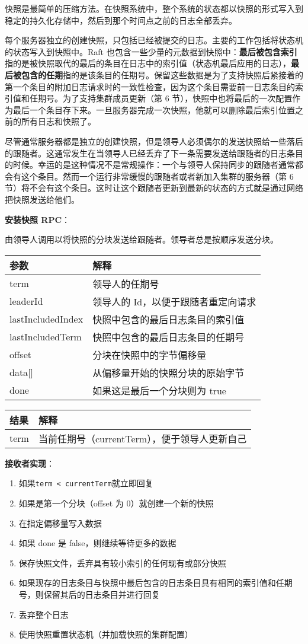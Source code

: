\documentclass[
]{article}
\begin{document}
快照是最简单的压缩方法。在快照系统中，整个系统的状态都以快照的形式写入到稳定的持久化存储中，然后到那个时间点之前的日志全部丢弃。

每个服务器独立的创建快照，只包括已经被提交的日志。主要的工作包括将状态机的状态写入到快照中。Raft
也包含一些少量的元数据到快照中：\textbf{最后被包含索引}指的是被快照取代的最后的条目在日志中的索引值（状态机最后应用的日志），\textbf{最后被包含的任期}指的是该条目的任期号。保留这些数据是为了支持快照后紧接着的第一个条目的附加日志请求时的一致性检查，因为这个条目需要前一日志条目的索引值和任期号。为了支持集群成员更新（第
6
节），快照中也将最后的一次配置作为最后一个条目存下来。一旦服务器完成一次快照，他就可以删除最后索引位置之前的所有日志和快照了。

尽管通常服务器都是独立的创建快照，但是领导人必须偶尔的发送快照给一些落后的跟随者。这通常发生在当领导人已经丢弃了下一条需要发送给跟随者的日志条目的时候。幸运的是这种情况不是常规操作：一个与领导人保持同步的跟随者通常都会有这个条目。然而一个运行非常缓慢的跟随者或者新加入集群的服务器（第
6
节）将不会有这个条目。这时让这个跟随者更新到最新的状态的方式就是通过网络把快照发送给他们。

\textbf{安装快照 RPC}：

由领导人调用以将快照的分块发送给跟随者。领导者总是按顺序发送分块。

\begin{longtable}[]{@{}ll@{}}
\toprule
参数 & 解释\tabularnewline
\midrule
\endhead
term & 领导人的任期号\tabularnewline
leaderId & 领导人的 Id，以便于跟随者重定向请求\tabularnewline
lastIncludedIndex & 快照中包含的最后日志条目的索引值\tabularnewline
lastIncludedTerm & 快照中包含的最后日志条目的任期号\tabularnewline
offset & 分块在快照中的字节偏移量\tabularnewline
data{[}{]} & 从偏移量开始的快照分块的原始字节\tabularnewline
done & 如果这是最后一个分块则为 true\tabularnewline
\bottomrule
\end{longtable}

\begin{longtable}[]{@{}ll@{}}
\toprule
结果 & 解释\tabularnewline
\midrule
\endhead
term & 当前任期号（currentTerm），便于领导人更新自己\tabularnewline
\bottomrule
\end{longtable}

\textbf{接收者实现}：

\begin{enumerate}
\def\labelenumi{\arabic{enumi}.}
\item
  如果\texttt{term\ \textless{}\ currentTerm}就立即回复
\item
  如果是第一个分块（offset 为 0）就创建一个新的快照
\item
  在指定偏移量写入数据
\item
  如果 done 是 false，则继续等待更多的数据
\item
  保存快照文件，丢弃具有较小索引的任何现有或部分快照
\item
  如果现存的日志条目与快照中最后包含的日志条目具有相同的索引值和任期号，则保留其后的日志条目并进行回复
\item
  丢弃整个日志
\item
  使用快照重置状态机（并加载快照的集群配置）
\end{enumerate}
\end{document}
